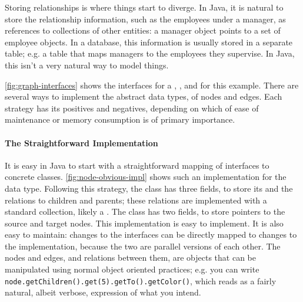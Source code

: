 Storing relationships is where things start to diverge. In Java, it is natural
to store the relationship information, such as the employees under a manager, as
references to collections of other entities: a manager object points to a set of
employee objects. In a database, this information is usually stored in a
separate table; e.g. a table that maps managers to the employees they supervise.
In Java, this isn't a very natural way to model things.

\autoref{fig:graph-interfaces} shows the interfaces for a
, , and  for this
example. There are several ways to implement the abstract data types, of nodes
and edges. Each strategy has its positives and negatives, depending on which of ease of
maintenance or memory consumption is of primary importance.

\paragraph{The Straightforward Implementation}
It is easy in Java to start with a straightforward mapping of interfaces to
concrete classes. \autoref{fig:node-obvious-impl} shows such an implementation
for the  data type. Following this strategy, the  class
has three fields, to store its  and the relations to children and
parents; these relations are implemented with a standard collection, likely a
. The  class has two fields, to store pointers to the
source and target nodes. This implementation is easy to implement. It is also
easy to maintain: changes to the interfaces can be directly mapped to changes to
the implementation, because the two are parallel versions of each other. The
nodes and edges, and relations between them, are objects that can be manipulated
using normal object oriented practices; e.g. you can write
\texttt{node.getChildren().get(5).getTo()\-.getColor()}, which reads as a fairly
natural, albeit verbose, expression of what you intend.


